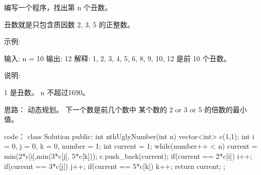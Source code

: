 编写一个程序，找出第 n 个丑数。

丑数就是只包含质因数 2, 3, 5 的正整数。

示例:

输入: n = 10
输出: 12
解释: 1, 2, 3, 4, 5, 6, 8, 9, 10, 12 是前 10 个丑数。

说明:  

    1 是丑数。
    n 不超过1690。































思路：
动态规划。
下一个数是前几个数中 某个数的 2 or 3 or 5 的倍数的最小值。






























code：
class Solution {
public:
    int nthUglyNumber(int n) {
        vector<int> c(1,1);
        int i = 0, j = 0, k = 0, number = 1;
        int current = 1;
        while(number++ < n)
        {
            current = min(2*c[i],min(3*c[j], 5*c[k]));
            c.push_back(current);
            if(current == 2*c[i]) i++;
            if(current == 3*c[j]) j++;
            if(current == 5*c[k]) k++;
        }
        return current;
    }
};